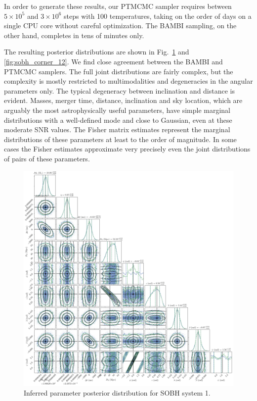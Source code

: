 \documentclass[aps,showpacs,twocolumn,prd,superscriptaddress,nofootinbib]{revtex4-1}
\begin{document}
In order to generate these results, our PTMCMC sampler requires between
$5\times 10^5$ and $3\times 10^6$ steps with 100 temperatures, taking on the
order of days on a single CPU core without careful optimization. The BAMBI
sampling, on the other hand, completes in tens of minutes only.

The resulting posterior distributions are shown in Fig.~\ref{fig:sobh_corner_1}
and \ref{fig:sobh_corner_12}. We find close agreement between the BAMBI and
PTMCMC samplers. The full joint distributions are fairly complex, but the
complexity is mostly restricted to multimodalities and degeneracies in the
angular parameters only. The typical degeneracy between inclination and distance
is evident. Masses, merger time, distance, inclination and sky location, which
are arguably the most astrophysically useful parameters, have simple marginal
distributions with a well-defined mode and close to Gaussian, even at these
moderate SNR values. The Fisher matrix estimates represent the marginal
distributions of these parameters at least to the order of magnitude. In some
cases the Fisher estimates approximate very precisely even the joint
distributions of pairs of these parameters.

\begin{figure}
	\includegraphics[width=\textwidth]{../plots/corner_sobh_tdc1_ptmcmc_bambi}
	\caption{Inferred parameter posterior distribution for SOBH system 1.}
	\label{fig:sobh_corner_1}
\end{figure}
\end{document}
